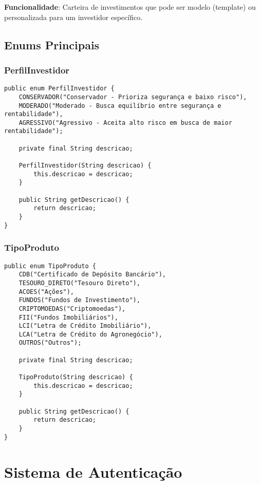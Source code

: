 \documentclass[12pt,a4paper]{article}
\begin{document}
\textbf{Funcionalidade}: Carteira de investimentos que pode ser modelo (template) ou personalizada para um investidor específico.

\subsection{Enums Principais}

\subsubsection{PerfilInvestidor}

\begin{lstlisting}[caption=Enum PerfilInvestidor]
public enum PerfilInvestidor {
    CONSERVADOR("Conservador - Prioriza segurança e baixo risco"),
    MODERADO("Moderado - Busca equilíbrio entre segurança e rentabilidade"),
    AGRESSIVO("Agressivo - Aceita alto risco em busca de maior rentabilidade");
    
    private final String descricao;
    
    PerfilInvestidor(String descricao) {
        this.descricao = descricao;
    }
    
    public String getDescricao() {
        return descricao;
    }
}
\end{lstlisting}

\subsubsection{TipoProduto}

\begin{lstlisting}[caption=Enum TipoProduto]
public enum TipoProduto {
    CDB("Certificado de Depósito Bancário"),
    TESOURO_DIRETO("Tesouro Direto"),
    ACOES("Ações"),
    FUNDOS("Fundos de Investimento"),
    CRIPTOMOEDAS("Criptomoedas"),
    FII("Fundos Imobiliários"),
    LCI("Letra de Crédito Imobiliário"),
    LCA("Letra de Crédito do Agronegócio"),
    OUTROS("Outros");
    
    private final String descricao;
    
    TipoProduto(String descricao) {
        this.descricao = descricao;
    }
    
    public String getDescricao() {
        return descricao;
    }
}
\end{lstlisting}

\section{Sistema de Autenticação}
\end{document}
